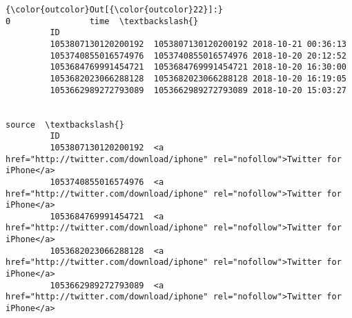 \documentclass[11pt]{article}
\begin{document}
\begin{Verbatim}[commandchars=\\\{\}]
{\color{outcolor}Out[{\color{outcolor}22}]:}                                        0                time  \textbackslash{}
         ID                                                             
         1053807130120200192  1053807130120200192 2018-10-21 00:36:13   
         1053740855016574976  1053740855016574976 2018-10-20 20:12:52   
         1053684769991454721  1053684769991454721 2018-10-20 16:30:00   
         1053682023066288128  1053682023066288128 2018-10-20 16:19:05   
         1053662989272793089  1053662989272793089 2018-10-20 15:03:27   
         
                                                                                                          source  \textbackslash{}
         ID                                                                                                        
         1053807130120200192  <a href="http://twitter.com/download/iphone" rel="nofollow">Twitter for iPhone</a>   
         1053740855016574976  <a href="http://twitter.com/download/iphone" rel="nofollow">Twitter for iPhone</a>   
         1053684769991454721  <a href="http://twitter.com/download/iphone" rel="nofollow">Twitter for iPhone</a>   
         1053682023066288128  <a href="http://twitter.com/download/iphone" rel="nofollow">Twitter for iPhone</a>   
         1053662989272793089  <a href="http://twitter.com/download/iphone" rel="nofollow">Twitter for iPhone</a>   
         

\end{Verbatim}
\end{document}
